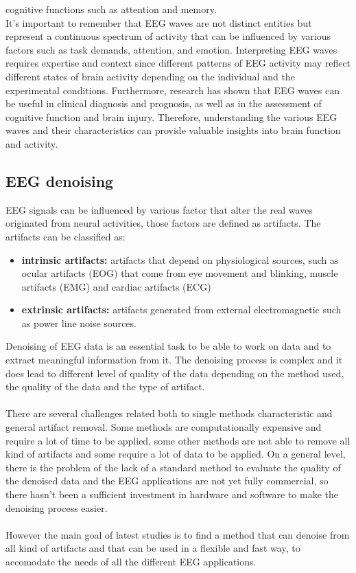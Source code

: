 \documentclass[a4paper, noexaminfo]{sapthesis}
\begin{document}
cognitive functions such as attention and memory.\newline \\
It's important to remember that EEG waves are not distinct entities but 
represent a continuous spectrum of activity that can be influenced by
various factors such as task demands, attention, and emotion. Interpreting EEG waves requires expertise 
and context since different patterns of EEG activity may reflect 
different states of brain activity depending on the individual and the 
experimental conditions. Furthermore, research has shown that EEG waves
can be useful in clinical diagnosis and prognosis, as well as in the
assessment of cognitive function and brain injury. Therefore, 
understanding the various EEG waves and their characteristics 
can provide valuable insights into brain function and activity.
\subsection{EEG denoising}
EEG signals can be influenced by various factor that alter the real waves 
originated from neural activities, those factors are defined as artifacts. 
The artifacts can be classified as\cite{EEG artifact}: 
\begin{itemize}
    \item \textbf{intrinsic artifacts:}
    artifacts that depend on physiological sources, such as ocular artifacts (EOG)
    that come from eye movement and blinking, muscle artifacts (EMG) and
     cardiac artifacts (ECG)
    \item \textbf{extrinsic artifacts:} artifacts generated from external electromagnetic 
    such as power line noise
    sources.
\end{itemize}
Denoising of EEG data is an essential task to be able to work on data and to
extract meaningful information from it. The denoising process is complex and
it does lead to different level of quality of the data depending on the 
method used, the quality of the data and the type of artifact.\\ \\
There are several challenges\cite{denoising challenges} related both 
to single methods characteristic and general artifact removal.
Some methods are computationally expensive and require a lot
of time to be applied, some other methods are not able to remove all kind of
artifacts and some require a lot of data to be applied. On a general
level, there is the problem of the lack of a standard method to evaluate
the quality of the denoised data and the EEG applications are not 
yet fully commercial, so there hasn't been a sufficient investment in
hardware and software to make the denoising process easier.\\ \\
However the main goal of latest studies is to find a method that can
denoise from all kind of artifacts and that can be used in a flexible
and fast way, to accomodate the needs of all the different EEG applications.
\end{document}
